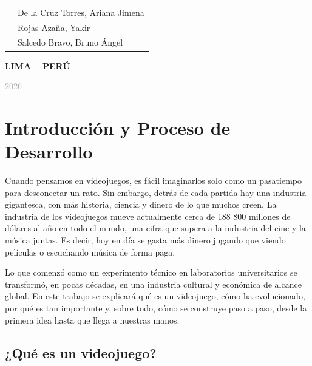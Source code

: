\documentclass[12pt]{report}
\begin{document}
\begin{titlepage}
\begin{center}
\begin{tabular}{p{4cm}p{9cm}}
&
{\large De la Cruz Torres, Ariana Jimena}

\\

&
{\large Rojas Azaña, Yakir}

\\

&
{\large Salcedo Bravo, Bruno Ángel}

\end{tabular}

\vfill

{\Large\bfseries\textcolor{SanMarcosRed}{
LIMA -- PERÚ
}}

\vspace{0.15cm}

{\large\textcolor{DarkGray}{
2026
}}

\end{center}
\end{titlepage}

\clearpage
\setcounter{page}{1}

\tableofcontents

\chapter{Introducción y Proceso de Desarrollo}

Cuando pensamos en videojuegos, es fácil imaginarlos solo como un pasatiempo para desconectar un rato. Sin embargo, detrás de cada partida hay una industria gigantesca, con más historia, ciencia y dinero de lo que muchos creen. La industria de los videojuegos mueve actualmente cerca de 188 800 millones de dólares al año en todo el mundo, una cifra que supera a la industria del cine y la música juntas. Es decir, hoy en día se gasta más dinero jugando que viendo películas o escuchando música de forma paga. 

Lo que comenzó como un experimento técnico en laboratorios universitarios se transformó, en pocas décadas, en una industria cultural y económica de alcance global. En este trabajo se explicará qué es un videojuego, cómo ha evolucionado, por qué es tan importante y, sobre todo, cómo se construye paso a paso, desde la primera idea hasta que llega a nuestras manos.

\section{¿Qué es un videojuego?}
\end{document}
